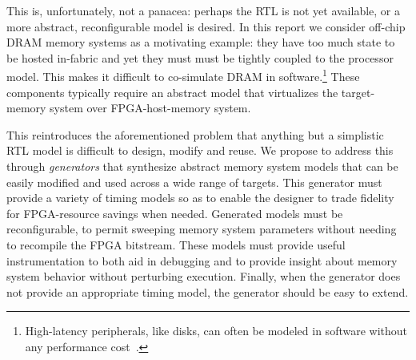 This is, unfortunately, not a panacea: perhaps the RTL is not yet
available, or a more abstract, reconfigurable model is desired. In this report
we consider off-chip DRAM memory systems as a motivating example: they have too
much state to be hosted in-fabric and yet they must must be tightly coupled to
the processor model. This makes it difficult to co-simulate DRAM in
software.\footnote{High-latency peripherals, like disks, can often be modeled
in software without any performance cost~\cite{disksim}.} These components
typically require an abstract model that virtualizes the target-memory system
over FPGA-host-memory system.

This reintroduces the aforementioned problem that anything but a simplistic RTL
model is difficult to design, modify and reuse. We propose to address this
through \emph{generators} that synthesize abstract memory system models that
can be easily modified and used across a wide range of targets.  This generator
must provide a variety of timing models so as to enable the designer to trade
fidelity for FPGA-resource savings when needed. Generated models must be reconfigurable, to
permit sweeping memory system parameters without needing to recompile the FPGA
bitstream. These models must provide useful instrumentation to both aid in
debugging and to provide insight about memory system behavior without
perturbing execution. Finally, when the generator does not provide an
appropriate timing model, the generator should be easy to extend.
